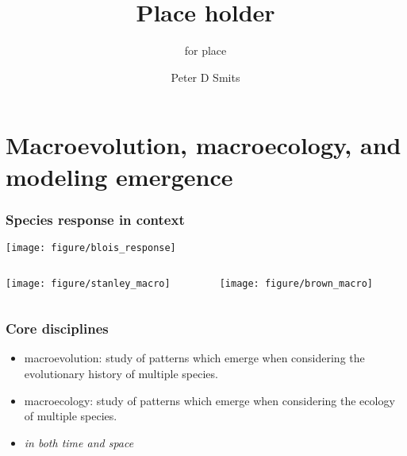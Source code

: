 \documentclass{beamer}
\title{Place holder}
\subtitle{for place}
\author{Peter D Smits}
\institute{Department of Integrative Biology, University of California -- Berkeley}
\begin{document}
\begin{frame}
  \maketitle
\end{frame}

\begin{frame}
  \tableofcontents
\end{frame}

\section{Macroevolution, macroecology, and modeling emergence}

\begin{frame}
  \frametitle{Species response in context}
  
  \begin{center}
    \texttt{[image: figure/blois\_response]}
  \end{center}
  \tiny{}
\end{frame}

\begin{frame}
  \begin{columns}
    \begin{column}{0.5\textwidth}
      \begin{center}
        \texttt{[image: figure/stanley\_macro]}
      \end{center}
    \end{column}
    \begin{column}{0.5\textwidth}
      \begin{center}
        \texttt{[image: figure/brown\_macro]}
      \end{center}
    \end{column}
  \end{columns}
\end{frame}

\begin{frame}
  \frametitle{Core disciplines}
  \begin{definition}
    \begin{itemize}
      \item \alert{macroevolution}: study of patterns which emerge when considering the evolutionary history of multiple species.
      \item \alert{macroecology}: study of patterns which emerge when considering the ecology of multiple species.
      \item \emph{in both time and space}
    \end{itemize}
  \end{definition}
\end{frame}
\end{document}
